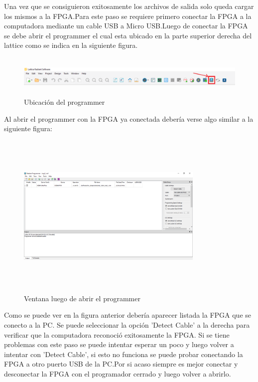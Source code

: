 \documentclass{article}
\begin{document}
Una vez que se consiguieron exitosamente los archivos de salida solo queda cargar los mismos a la FPGA.Para este paso se requiere primero conectar la FPGA a la computadora mediante un cable USB a Micro USB.Luego de conectar la FPGA se debe abrir el programmer el cual esta ubicado en la parte superior derecha del lattice como se indica en la siguiente figura.
	\begin{figure}[H]
 	\centering
	\includegraphics[height=2cm, width=\textwidth]{Imagenes/ProgrammerUbi.png}
	\caption{Ubicación del programmer}
	\end{figure}

Al abrir el programmer con la FPGA ya conectada debería verse algo similar a la siguiente figura:
	\begin{figure}[H]
 	\centering
	\includegraphics[height=8cm, width=0.8\textwidth]{Imagenes/Programmer.png}
	\caption{Ventana luego de abrir el programmer}
	\end{figure}
Como se puede ver en la figura anterior debería aparecer listada la FPGA que se conecto a la PC. Se puede seleccionar la opción 'Detect Cable' a la derecha para verificar que la computadora reconoció exitosamente la FPGA. Si se tiene problemas con este paso se puede intentar esperar un poco y luego volver a intentar con 'Detect Cable', si esto no funciona se puede probar conectando la FPGA a otro puerto USB de la PC.Por si acaso siempre es mejor conectar y desconectar la FPGA con el programador cerrado y luego volver a abrirlo.
\end{document}
